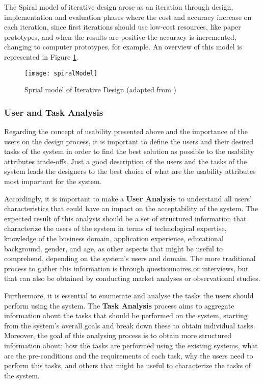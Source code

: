 The Spiral model of iterative design arose as an iteration through design, implementation and evaluation phases where the cost and accuracy increase on each iteration, since first iterations should use low-cost resources, like paper prototypes, and when the results are positive the accuracy is incremented, changing to computer prototypes, for example. \cite{interactionDesign_beyondHumanComputerInteraction} An overview of this model is represented in  Figure \ref{fig:spiralModel}.

\begin{figure}[htbp]
	\centering
	\texttt{[image: spiralModel]}
	\caption{Sprial model of Iterative Design (adapted from \cite{interactionDesign_beyondHumanComputerInteraction})}
	\label{fig:spiralModel}
\end{figure}

\subsubsection{User and Task Analysis}
\label{subsubsec:user_and_task_analysis}
Regarding the concept of usability presented above and the importance of the users on the design process, it is important to define the users and their desired tasks of the system in order to find the best solution as possible to the usability attributes trade-offs. Just a good description of the users and the tasks of the system leads the designers to the best choice of what are the usability attributes most important for the system.

Accordingly, it is important to make a \textbf{User Analysis} to understand all users’ characteristics that could have an impact on the acceptability of the system. The expected result of this analysis should be a set of structured information that characterize the users of the system in terms of technological expertise, knowledge of the business domain, application experience, educational background, gender, and age, as other aspects that might be useful to comprehend, depending on the system’s users and domain. \cite{userAnalysisInHCI_theHistoricalLessonFromIndividualDifferencesResearch} The more traditional process to gather this information is through questionnaires or interviews, but that can also be obtained by conducting market analyses or observational studies. \cite{usabilityEngineering}

Furthermore, it is essential to enumerate and analyse the tasks the users should perform using the system. The \textbf{Task Analysis} process aims to aggregate information about the tasks that should be performed on the system, starting from the system's overall goals and break down these to obtain individual tasks. \cite{usabilityEngineering} Moreover, the goal of this analysing process is to obtain more structured information about: how the tasks are performed using the existing systems, what are the pre-conditions and the requirements of each task, why the users need to perform this tasks, and others that might be useful to characterize the tasks of the system. 

